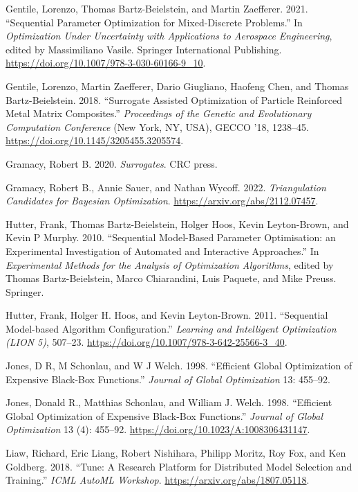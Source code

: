 \documentclass[
  twocolumn]{article}
\newlength{\cslhangindent}
\newenvironment{CSLReferences}[2] %
 {\begin{list}{}{%
  \setlength{\itemindent}{0pt}
  \setlength{\leftmargin}{0pt}
  \setlength{\parsep}{0pt}
  \ifodd #1
   \setlength{\leftmargin}{\cslhangindent}
   \setlength{\itemindent}{-1\cslhangindent}
  \fi
  \setlength{\itemsep}{#2\baselineskip}}}
 {\end{list}}
\begin{document}
\begin{CSLReferences}{1}{1}
Gentile, Lorenzo, Thomas Bartz-Beielstein, and Martin Zaefferer. 2021.
{``Sequential Parameter Optimization for Mixed-Discrete Problems.''} In
\emph{Optimization Under Uncertainty with Applications to Aerospace
Engineering}, edited by Massimiliano Vasile. Springer International
Publishing. \url{https://doi.org/10.1007/978-3-030-60166-9_10}.

Gentile, Lorenzo, Martin Zaefferer, Dario Giugliano, Haofeng Chen, and
Thomas Bartz-Beielstein. 2018. {``Surrogate Assisted Optimization of
Particle Reinforced Metal Matrix Composites.''} \emph{Proceedings of the
Genetic and Evolutionary Computation Conference} (New York, NY, USA),
GECCO '18, 1238--45. \url{https://doi.org/10.1145/3205455.3205574}.

Gramacy, Robert B. 2020. \emph{Surrogates}. {CRC} press.

Gramacy, Robert B., Annie Sauer, and Nathan Wycoff. 2022.
\emph{Triangulation Candidates for Bayesian Optimization}.
\url{https://arxiv.org/abs/2112.07457}.

Hutter, Frank, Thomas Bartz-Beielstein, Holger Hoos, Kevin Leyton-Brown,
and Kevin P Murphy. 2010. {``{Sequential Model-Based Parameter
Optimisation: an Experimental Investigation of Automated and Interactive
Approaches}.''} In \emph{Experimental Methods for the Analysis of
Optimization Algorithms}, edited by Thomas Bartz-Beielstein, Marco
Chiarandini, Luis Paquete, and Mike Preuss. Springer.

Hutter, Frank, Holger H. Hoos, and Kevin Leyton-Brown. 2011.
{``{Sequential Model-based Algorithm Configuration}.''} \emph{Learning
and Intelligent Optimization (LION 5)}, 507--23.
\url{https://doi.org/10.1007/978-3-642-25566-3_40}.

Jones, D R, M Schonlau, and W J Welch. 1998. {``{Efficient Global
Optimization of Expensive Black-Box Functions}.''} \emph{Journal of
Global Optimization} 13: 455--92.

Jones, Donald R., Matthias Schonlau, and William J. Welch. 1998.
{``{Efficient Global Optimization of Expensive Black-Box Functions}.''}
\emph{Journal of Global Optimization} 13 (4): 455--92.
\url{https://doi.org/10.1023/A:1008306431147}.

Liaw, Richard, Eric Liang, Robert Nishihara, Philipp Moritz, Roy Fox,
and Ken Goldberg. 2018. {``{Tune: A Research Platform for Distributed
Model Selection and Training}.''} \emph{ICML AutoML Workshop}.
\url{https://arxiv.org/abs/1807.05118}.


\end{CSLReferences}
\end{document}

